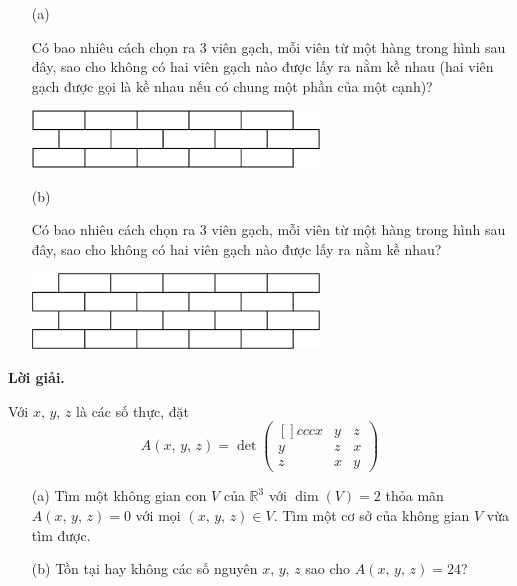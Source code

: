 \begin{tcolorbox}[title=\textbf{Bài toán B.4.},breakable]
    \begin{enumerate}
        \item[(a)] {Có bao nhiêu cách chọn ra 3 viên gạch, mỗi viên từ một hàng trong hình sau đây, sao cho không có hai viên gạch nào được lấy ra nằm kề nhau (hai viên gạch được gọi là kề nhau nếu có chung một phần của một cạnh)?
        
        \begin{center}
            \includegraphics[width=0.6\textwidth]{Figures/02.png}
        \end{center}}
        \item[(b)] {Có bao nhiêu cách chọn ra 3 viên gạch, mỗi viên từ một hàng trong hình sau đây, sao cho không có hai viên gạch nào được lấy ra nằm kề nhau?
        
        \begin{center}
            \includegraphics[width=0.6\textwidth]{Figures/03.png}
        \end{center}}
    \end{enumerate}
\end{tcolorbox}

\textbf{Lời giải. }

\begin{tcolorbox}[title=\textbf{Bài toán B.5 + A.4.},breakable]
    Với $x,\,y,\,z$ là các số thực, đặt 
    $$A(x,\,y,\,z) = \det \begin{pmatrix}[]{ccc}
        x & y & z \\
        y & z & x \\
        z & x & y
    \end{pmatrix}$$
    \begin{enumerate}
        \item[(a)] {Tìm một không gian con $V$ của $\mathbb{R}^3$ với $\dim (V) = 2$ thỏa mãn $A(x,\,y,\,z)=0$ với mọi $(x,\,y,\,z) \in V$. Tìm một cơ sở của không gian $V$ vừa tìm được.}
        \item[(b)] {Tồn tại hay không các số nguyên $x,\,y,\,z$ sao cho $A(x,\,y,\,z) = 24$?}
    \end{enumerate}
\end{tcolorbox}

